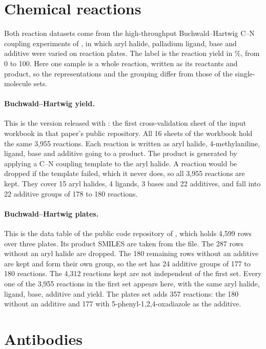 \section{Chemical reactions}\label{app:datasets:reactions}

Both reaction datasets come from the high-throughput Buchwald--Hartwig C--N coupling experiments of \citet{Ahneman2018}, in which aryl halide, palladium ligand, base and additive were varied on reaction plates. The label is the reaction yield in \%, from 0 to 100. Here one sample is a whole reaction, written as its reactants and product, so the representations and the grouping differ from those of the single-molecule sets.

\paragraph{Buchwald--Hartwig yield.} This is the version released with \citet{Schwaller2021a}: the first cross-validation sheet of the input workbook in that paper's public repository. All 16 sheets of the workbook hold the same 3,955 reactions. Each reaction is written as aryl halide, 4-methylaniline, ligand, base and additive going to a product. The product is generated by applying a C--N coupling template to the aryl halide. A reaction would be dropped if the template failed, which it never does, so all 3,955 reactions are kept. They cover 15 aryl halides, 4 ligands, 3 bases and 22 additives, and fall into 22 additive groups of 178 to 180 reactions.

\paragraph{Buchwald--Hartwig plates.} This is the data table of the public code repository of \citet{Ahneman2018}, which holds 4,599 rows over three plates. Its product SMILES are taken from the file. The 287 rows without an aryl halide are dropped. The 180 remaining rows without an additive are kept and form their own group, so the set has 24 additive groups of 177 to 180 reactions. The 4,312 reactions kept are not independent of the first set. Every one of the 3,955 reactions in the first set appears here, with the same aryl halide, ligand, base, additive and yield. The plates set adds 357 reactions: the 180 without an additive and 177 with 5-phenyl-1,2,4-oxadiazole as the additive.

\section{Antibodies}\label{app:datasets:antibodies}

